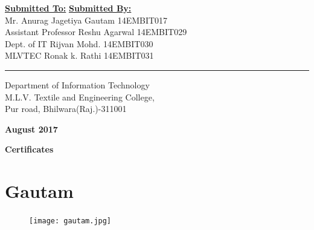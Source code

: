 \documentclass[twoside,a4paper,16pt]{book}
\begin{document}
\Large {\underline{\bf Submitted To:}} \hspace{7.5cm} {\underline{\bf Submitted By:}}\\
\hspace{-1.5cm}Mr. Anurag Jagetiya  \hspace{6.45cm} Gautam  \hspace{1.75cm} 14EMBIT017 \\
\hspace{-1.5cm}Assistant Professor \hspace{6.85cm}   Reshu Agarwal \hspace{0.15cm}   14EMBIT029\\
\hspace{-1.45cm}Dept. of IT \hspace{8.5cm}  Rijvan Mohd.  \hspace{0.45cm}   14EMBIT030\\
\hspace{-1.45cm}MLVTEC \hspace{8.85cm}  Ronak k. Rathi  \hspace{0.15cm}   14EMBIT031\\



\vspace{1.2cm}

\rule{170mm}{1mm}

\begin{center}
{\color{red}
\Large Department of Information Technology\\
M.L.V. Textile and Engineering College,\\
Pur road, Bhilwara(Raj.)-311001 }

\vspace{0.3cm}

{\bf August 2017}
\end{center}


\newpage
\frontmatters
\begin{center}
 \huge{\bf Certificates}
\end{center}



\section{Gautam}

\vspace{0.6cm}

\begin{figure}[ht!]
\begin{center}
\texttt{[image: gautam.jpg]}
\end{center}
\end{figure}
\end{document}
